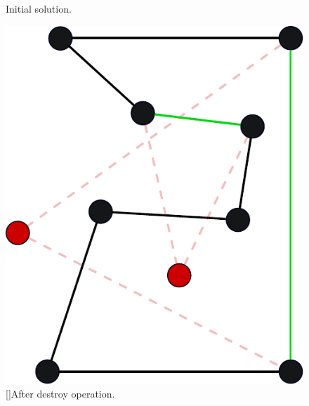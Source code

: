 \documentclass[aspectratio=1610]{beamer}
\begin{document}
\begin{frame}[noframenumbering]
{\begin{minipage}[t]{0.3\linewidth}
\begin{figure}
	\caption{Initial solution.}
\end{figure}
\end{minipage}%
\hfill%
\begin{minipage}[t]{.3\textwidth}
\begin{figure}
	\centering
	\includegraphics[width=\textwidth]{graphics/tsp-destroy-solution} 
	[]{After destroy operation.}
\end{figure}
\end{minipage}%
\hfill%
\begin{minipage}[t]{.3\textwidth}
\begin{figure}
	\centering

\end{figure}
\end{minipage}}
\end{frame}
\end{document}
